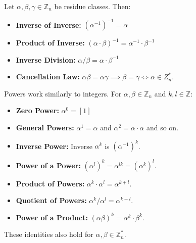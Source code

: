 \begin{theo}

    Let $\alpha,\beta,\gamma\in\mathbb{Z}_n$ be residue classes. Then: 
    \begin{itemize}
        \item \textbf{Inverse of Inverse:} $(\alpha^{-1})^{-1} = \alpha$
        \item \textbf{Product of Inverse:} $(\alpha\cdot\beta)^{-1} = \alpha^{-1}\cdot\beta^{-1}$
        \item \textbf{Inverse Division:} $\alpha/\beta = \alpha\cdot\beta^{-1}$
        \item \textbf{Cancellation Law:} $\alpha\beta = \alpha\gamma\implies\beta=\gamma\Longleftrightarrow\alpha\in Z_n^*$.
    \end{itemize}
\end{theo}
\begin{theo}
    
    Powers work similarly to integers. For $\alpha,\beta\in\mathbb{Z}_n$ and $k,l\in\mathbb{Z}$:
    \begin{itemize}
        \item \textbf{Zero Power:} $\alpha^0 = [1]$
        \item \textbf{General Powers:} $\alpha^1 = \alpha$ and $\alpha^2=\alpha\cdot\alpha$ and so on.
        \item \textbf{Inverse Power:} Inverse $\alpha^k$ is $(\alpha^{-1})^k$.
        \item \textbf{Power of a Power:} $(\alpha^l)^k = \alpha^{lk}= (\alpha^k)^l$.
        \item \textbf{Product of Powers:} $\alpha^k\cdot\alpha^l = \alpha^{k+l}$.
        \item \textbf{Quotient of Powers:} $\alpha^k/\alpha^l = \alpha^{k-l}$.
        \item \textbf{Power of a Product:} $(\alpha\beta)^k = \alpha^k\cdot\beta^k$.
    \end{itemize}
    \noindent
    These identities also hold for $\alpha,\beta\in \mathbb{Z}_n^*$.
\end{theo}

